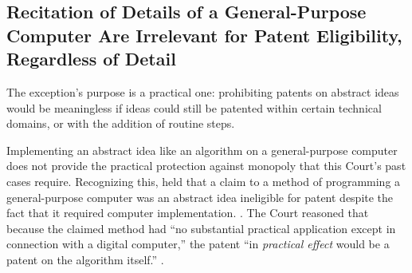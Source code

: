 \documentclass{scotus}
\begin{document}
\subsection{Recitation of Details of a General-Purpose Computer Are Irrelevant
for Patent Eligibility, Regardless of Detail}

The exception's purpose is a practical one:  prohibiting patents on abstract ideas
would be meaningless if ideas could still be patented within certain technical
domains, or with the addition of routine steps.
%

Implementing an abstract idea like an algorithm on a general-purpose computer does
not provide the practical protection against monopoly that this Court's past cases
require.  Recognizing this,  held that a claim to a method of
programming a general-purpose computer was an abstract idea ineligible for patent
despite the fact that it required computer implementation. .  The Court reasoned that because the claimed method had ``no substantial
practical application except in connection with a digital computer,'' the patent
``in \emph{practical effect} would be a patent on the algorithm itself.''
. \iffalse COMMENTED BECAUSE I THINK
IT'S REDUNDANT WITH THE NEXT PARAGRAPH --ANNA Instead, requiring computer
implementation is like adding “conventional activity” to an abstract idea,
\clause{mayo at 1300}, or limiting it to a “particular technological environment,”
\clause{bilski at 3230 (quoting \sentence{diehr at 191-192})}, both of which the
Court rejects as attempts to “circumvent[]” the exception, \clause{mayo at 1294
(quoting \sentence{bilski at 3225})}.  Thus, \inline{flook} held that neither
limiting an abstract idea to use within the petrochemical industry, nor adding
“post-solution activity” like adjusting a threshold value, could render it
patent-eligible. \sentence{parker at 590}. \inline{bilski} held that a method of
hedging was unpatentable even when limited to energy markets. \sentence{bilski at
3231}.  And \inline{mayo} held that adding “well-understood, routine, conventional
activity previously engaged in by researchers in the field” was not a “meaningful
limit.” \sentence{mayo at 1294, 99999}. \fi
\end{document}
